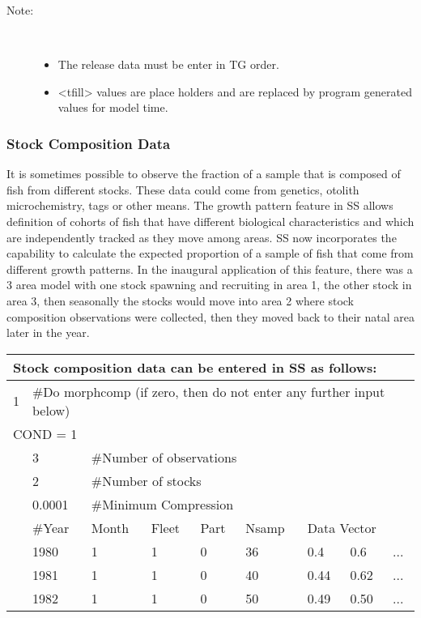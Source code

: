 \begin{description}
	\item[Note:]\
	\begin{itemize}
		\item The release data must be enter in TG order.
		\item <tfill> values are place holders and are replaced by program generated values for model time.
	\end{itemize}
\end{description}

\subsubsection{Stock Composition Data}
It is sometimes possible to observe the fraction of a sample that is composed of fish from different stocks.  These data could come from genetics, otolith microchemistry, tags or other means.  The growth pattern feature in SS allows definition of cohorts of fish that have different biological characteristics and which are independently tracked as they move among areas.  SS now incorporates the capability to calculate the expected proportion of a sample of fish that come from different growth patterns.  In the inaugural application of this feature, there was a 3 area model with one stock spawning and recruiting in area 1, the other stock in area 3, then seasonally the stocks would move into area 2 where stock composition observations were collected, then they moved back to their natal area later in the year.

\begin{center}
	\begin{tabular}{p{1.1cm} p{1.1cm} p{1.1cm} p{1.1cm} p{1.1cm} p{1.1cm} p{1.1cm} p{1.1cm} p{1.1cm}}
		\multicolumn{9}{l}{Stock composition data can be entered in SS as follows:}\\
		\hline
		1 &  \multicolumn{8}{l}{\#Do morphcomp (if zero, then do not enter any further input below)}\\
		\hline
		\multicolumn{9}{l}{COND = 1}\\ 
		& 3 & \multicolumn{7}{l}{\#Number of observations}\\
		\hline
		& 2 & \multicolumn{7}{l}{\#Number of stocks}\\
		\hline
		& 0.0001 & \multicolumn{7}{l}{\#Minimum Compression}\\
		\hline
		& \#Year & Month & Fleet & Part & Nsamp & \multicolumn{3}{l}{Data Vector} \\
		\hline
		& 1980 & 1 & 1 & 0 & 36 & 0.4 & 0.6 & ...\\
		& 1981 & 1 & 1 & 0 & 40 & 0.44 & 0.62 & ...\\
		& 1982 & 1 & 1 & 0 & 50 & 0.49 & 0.50 & ...\\
		\hline
	\end{tabular}
\end{center}

